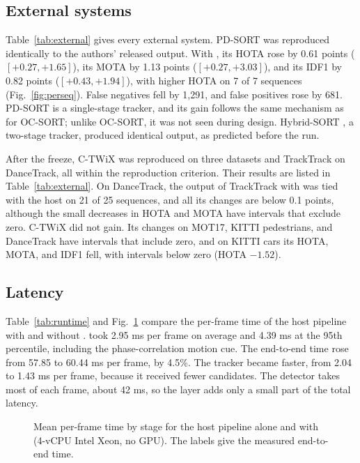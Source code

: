 \subsection{External systems}\label{sec:external}
Table~\ref{tab:external} gives every external system. PD-SORT
\cite{wang2025pdsort} was reproduced identically to the authors' released
output. With \scl{}, its HOTA rose by 0.61 points ($[+0.27,+1.65]$), its
MOTA by 1.13 points ($[+0.27,+3.03]$), and its IDF1 by 0.82 points
($[+0.43,+1.94]$), with higher HOTA on 7 of 7 sequences
(Fig.~\ref{fig:perseq}). False negatives fell by 1,291, and false positives
rose by 681. PD-SORT is a single-stage tracker, and its gain follows the same
mechanism as for OC-SORT; unlike OC-SORT, it was not seen during design.
Hybrid-SORT \cite{yang2024hybridsort}, a two-stage tracker, produced identical
output, as predicted before the run.

After the freeze, C-TWiX \cite{miah2025twix} was reproduced on three datasets
and TrackTrack \cite{shim2025tracktrack} on DanceTrack, all within the
reproduction criterion. Their results are listed in Table~\ref{tab:external}. On
DanceTrack, the output of TrackTrack with \scl{} was tied with the host on
21 of 25 sequences, and all its changes are below 0.1 points, although the
small decreases in HOTA and MOTA have intervals that exclude zero. C-TWiX did
not gain. Its changes on MOT17, KITTI pedestrians, and DanceTrack have
intervals that include zero, and on KITTI cars its HOTA, MOTA, and IDF1 fell,
with intervals below zero (HOTA $-1.52$).



\subsection{Latency}\label{sec:latency}
Table~\ref{tab:runtime} and Fig.~\ref{fig:runtime} compare the per-frame time
of the host pipeline with and without \scl{}. \scl{} took 2.95 ms per
frame on average and 4.39 ms at the 95th percentile, including the
phase-correlation motion cue. The end-to-end time rose from 57.85 to 60.44 ms
per frame, by 4.5\%. The tracker became faster, from 2.04 to 1.43 ms per
frame, because it received fewer candidates. The detector takes most of each
frame, about 42 ms, so the layer adds only a small part of the total latency.



\begin{figure}[t]
\centering

\caption{Mean per-frame time by stage for the host pipeline alone and with
\scl{} (4-vCPU Intel Xeon, no GPU). The labels give the measured
end-to-end time.}
\label{fig:runtime}
\end{figure}
